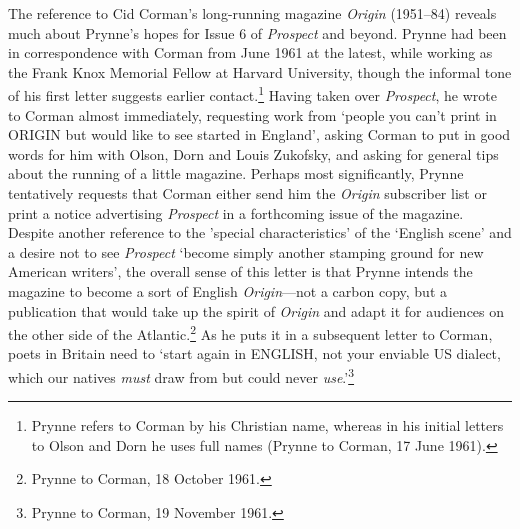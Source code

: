 \documentclass[]{article}
\begin{document}
The reference to Cid Corman's long-running magazine \emph{Origin}
(1951--84) reveals much about Prynne's hopes for Issue 6 of
\emph{Prospect} and beyond. Prynne had been in correspondence with
Corman from June 1961 at the latest, while working as the Frank Knox
Memorial Fellow at Harvard University, though the informal tone of his
first letter suggests earlier contact.\footnote{Prynne refers to Corman
  by his Christian name, whereas in his initial letters to Olson and
  Dorn he uses full names (Prynne to Corman, 17 June 1961).} Having
taken over \emph{Prospect}, he wrote to Corman almost immediately,
requesting work from `people you can't print in ORIGIN but would like to
see started in England', asking Corman to put in good words for him with
Olson, Dorn and Louis Zukofsky, and asking for general tips about the
running of a little magazine. Perhaps most significantly, Prynne
tentatively requests that Corman either send him the \emph{Origin}
subscriber list or print a notice advertising \emph{Prospect} in a
forthcoming issue of the magazine. Despite another reference to the
'special characteristics' of the `English scene' and a desire not to see
\emph{Prospect} `become simply another stamping ground for new American
writers', the overall sense of this letter is that Prynne intends the
magazine to become a sort of English \emph{Origin}---not a carbon copy,
but a publication that would take up the spirit of \emph{Origin} and
adapt it for audiences on the other side of the Atlantic.\footnote{Prynne
  to Corman, 18 October 1961.} As he puts it in a subsequent letter to
Corman, poets in Britain need to `start again in ENGLISH, not your
enviable US dialect, which our natives \emph{must} draw from but could
never \emph{use}.'\footnote{Prynne to Corman, 19 November 1961.}
\end{document}
